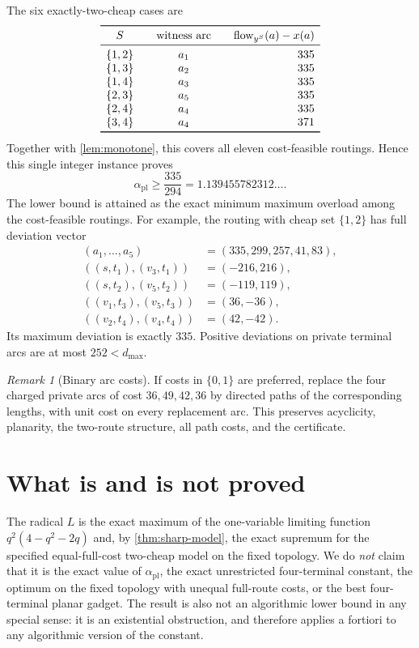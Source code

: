 \documentclass[11pt]{article}
\theoremstyle{remark}
\newtheorem{remark}[theorem]{Remark}
\newcommand{\apl}{\alpha_{\mathrm{pl}}}
\newcommand{\flow}{\operatorname{flow}}
\begin{document}
The six exactly-two-cheap cases are
\[
\begin{array}{c@{\qquad}c@{\qquad}r}
\toprule
S&\text{witness arc}&\flow_{y^S}(a)-x(a)\\
\midrule
\{1,2\}&a_1&335\\
\{1,3\}&a_2&335\\
\{1,4\}&a_3&335\\
\{2,3\}&a_5&335\\
\{2,4\}&a_4&335\\
\{3,4\}&a_4&371\\
\bottomrule
\end{array}
\]
Together with \cref{lem:monotone}, this covers all eleven cost-feasible
routings.  Hence this single integer instance proves
\[
 \apl\ge\frac{335}{294}=1.139455782312\ldots.
\]
The lower bound is attained as the exact minimum maximum overload among the
cost-feasible routings.  For example, the routing with cheap set $\{1,2\}$
has full deviation vector
\[
\begin{aligned}
 (a_1,\ldots,a_5)&=(335,299,257,41,83),\\
 ((s,t_1),(v_3,t_1))&=(-216,216),\\
 ((s,t_2),(v_5,t_2))&=(-119,119),\\
 ((v_1,t_3),(v_5,t_3))&=(36,-36),\\
 ((v_2,t_4),(v_4,t_4))&=(42,-42).
\end{aligned}
\]
Its maximum deviation is exactly $335$.  Positive deviations on private
terminal arcs are at most $252<d_{\max}$.

\begin{remark}[Binary arc costs]
If costs in $\{0,1\}$ are preferred, replace the four charged private arcs
of cost $36,49,42,36$ by directed paths of the corresponding lengths, with
unit cost on every replacement arc.  This preserves acyclicity, planarity,
the two-route structure, all path costs, and the certificate.
\end{remark}

\section{What is and is not proved}

The radical $L$ is the exact maximum of the one-variable limiting function
$q^2(4-q^2-2q)$ and, by \cref{thm:sharp-model}, the exact supremum for the
specified equal-full-cost two-cheap model on the fixed topology.  We do
\emph{not} claim that it is the exact value of $\apl$, the exact unrestricted
four-terminal constant, the optimum on the fixed topology with unequal
full-route costs, or the best four-terminal planar gadget.  The result is
also not an algorithmic lower bound in any special sense: it is an
existential obstruction, and therefore applies a fortiori to any
algorithmic version of the constant.
\end{document}
